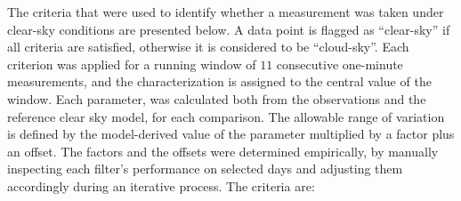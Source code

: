 \documentclass[applsci,article,submit,moreauthors,pdftex]{Definitions/mdpi}
\begin{document}
The criteria that were used to identify whether a measurement was taken
under clear-sky conditions are presented below. A data point is flagged
as ``clear-sky'' if all criteria are satisfied, otherwise it is
considered to be ``cloud-sky''. Each criterion was applied for a running
window of \(11\) consecutive one-minute measurements, and the
characterization is assigned to the central value of the window. Each
parameter, was calculated both from the observations and the reference
clear sky model, for each comparison. The allowable range of variation
is defined by the model-derived value of the parameter multiplied by a
factor plus an offset. The factors and the offsets were determined
empirically, by manually inspecting each filter's performance on
selected days and adjusting them accordingly during an iterative
process. The criteria are:
\end{document}
